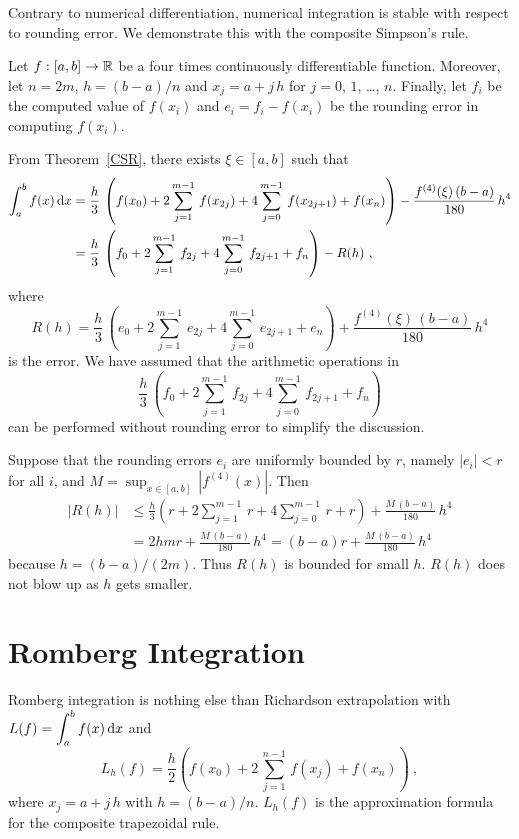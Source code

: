 \begin{rmk}
Contrary to numerical differentiation, numerical integration is
stable with respect to rounding error.  We demonstrate this with the
composite Simpson's rule.

Let $f:[a,b]\rightarrow \mathbb{R}$ be a four times continuously
differentiable function.  Moreover, let $n=2m$, $h=(b-a)/n$ and
$x_j = a+j\,h$ for $j=0$, $1$, \ldots, $n$.  Finally, let
$f_i$ be the computed value of $f(x_i)$ and
$e_i = f_i - f(x_i)$ be the rounding error in computing
$f(x_i)$.

From Theorem~\ref{CSR}, there exists $\xi \in [a,b]$ such that
\begin{align*}
\int_{a}^{b}f(x)\,\mathrm{d}x &=
\frac{h}{3}\, \left(f(x_0) + 2\sum_{j=1}^{m-1}\,f(x_{2j}) + 4
\sum_{j=0}^{m-1}\,f(x_{2j+1}) + f(x_n) \right) -
\frac{f^{(4)}(\xi)\,(b-a)}{180}\,h^4 \\
&= \frac{h}{3}\, \left(f_0 + 2 \sum_{j=1}^{m-1}\,f_{2j}
+ 4 \sum_{j=0}^{m-1}\,f_{2j+1} + f_n \right) - R(h) \ ,
\end{align*}
where
\[
R(h) = \frac{h}{3}\, \left(e_0 + 2\sum_{j=1}^{m-1}\,e_{2j}
+ 4 \sum_{j=0}^{m-1}\,e_{2j+1} + e_n \right) +
\frac{f^{(4)}(\xi)\,(b-a)}{180}\,h^4
\]
is the error.  We have assumed that the arithmetic operations in
\[
\frac{h}{3}\, \left(f_0 + 2 \sum_{j=1}^{m-1}\,f_{2j}
+ 4 \sum_{j=0}^{m-1}\,f_{2j+1} + f_n \right)
\]
can be performed without rounding error to simplify the discussion.

Suppose that the rounding errors $e_i$ are uniformly bounded by
$r$, namely $|e_i| < r$ for all $i$, and
$M = \sup_{x \in [a,b]}\,|f^{(4)}(x)|$.  Then
\begin{align*}
|R(h)| &\leq \frac{h}{3} \left(r + 2\sum_{j=1}^{m-1}\,r + 4
\sum_{j=0}^{m-1}\,r + r \right) + \frac{M\,(b-a)}{180}\,h^4 \\
&= 2hmr + \frac{M\,(b-a)}{180}\,h^4
= (b-a)r + \frac{M\,(b-a)}{180}\,h^4
\end{align*}
because $h = (b-a)/(2m)$.  Thus $R(h)$ is bounded for small $h$.
$R(h)$ does not blow up as $h$ gets smaller.
\end{rmk}

\section{Romberg Integration}

Romberg integration is nothing else than Richardson extrapolation
with $\displaystyle L(f) = \int_{a}^{b} f(x)\,\mathrm{d}x$ and
\begin{equation} \label{Rombform}
L_h(f) = \frac{h}{2} \left( f(x_0) + 2\,\sum_{j=1}^{n-1}\,f(x_j)
+ f(x_n)\right) \ ,
\end{equation}
where $x_j = a + j\,h$ with $h=(b-a)/n$.  $L_h(f)$ is
the approximation formula for the composite trapezoidal rule.

